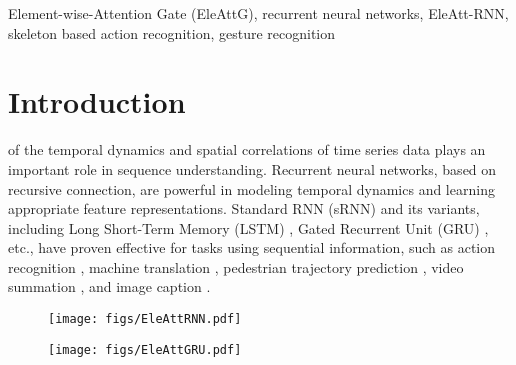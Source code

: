\documentclass[journal]{IEEEtran}
\newcommand{\Outer}{Element-wise}
\begin{document}
\begin{IEEEkeywords}
	\Outer-Attention Gate (EleAttG), recurrent neural networks, EleAtt-RNN,  skeleton based action recognition, gesture recognition
\end{IEEEkeywords}
\IEEEpeerreviewmaketitle
\section{Introduction}

 of the temporal dynamics and spatial correlations of time series data plays an important role in sequence understanding. Recurrent neural networks, based on recursive connection, are powerful in modeling temporal dynamics and learning appropriate feature representations. Standard RNN (sRNN) and its variants, including Long Short-Term Memory (LSTM) \cite{hochreiter1997long}, Gated Recurrent Unit (GRU) \cite{cho14}, etc., have proven effective for tasks using sequential information, such as action recognition \cite{du2015hierarchical}, machine translation \cite{cho14},  pedestrian trajectory prediction \cite{zhang2019sr}, video summation \cite{zhao2018hsa}, and image caption \cite{vinyals2015show}.

\begin{figure*}[!t]
	\centering
	\begin{subfigure}[t]{0.4\linewidth}
		\centering\texttt{[image: figs/EleAttRNN.pdf]}
		\caption{}
		\label{subfig:generalRNN}
	\end{subfigure}	
	\hfil
	\begin{subfigure}[t]{0.45\linewidth}
		\centering\texttt{[image: figs/EleAttGRU.pdf]}
		\caption{}			
		\label{subfig:EleGGRU}
	\end{subfigure}
	\caption[]{Illustration of \Outer-Attention Gate (EleAttG) (marked in red) for (a) a generic RNN block, where the RNN structure could be the standard RNN, LSTM, or GRU and (b) a GRU block which consists of a group of ({\it e.g.,} $N$) GRU neurons. In the diagram, each line carries a vector. The brown circles denote element-wise operation, {\it e.g.,} element-wise vector product or vector addition. The yellow boxes denote the units of the original GRU with the output dimension of $N$. The red box denotes the EleAttG with an output dimension of $D$, which is the same as the dimension of the input $\bf{x}_t$.}\label{fig:IAttRNN}
\end{figure*}
\end{document}
